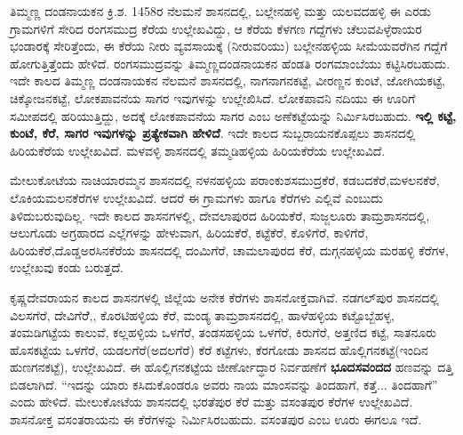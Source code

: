 ತಿಮ್ಮಣ್ಣ ದಂಡನಾಯಕನ ಕ್ರಿ.ಶ. 1458ರ ನೆಲಮನೆ ಶಾಸನದಲ್ಲಿ, ಬಲ್ಲೇನಹಳ್ಳಿ ಮತ್ತು ಯಲವದಹಳ್ಳಿ ಈ ಎರಡು ಗ್ರಾಮಗಳಿಗೆ ಸೇರಿದ ರಂಗಸಮುದ್ರ ಕೆರೆಯ ಉಲ್ಲೇಖವಿದ್ದು, ಆ ಕೆರೆಯ ಕೆಳಗಣ ಗದ್ದೆಗಳು ಚೆಲುವಪಿಳ್ಳೆರಾಯರ ಭಂಡಾರಕ್ಕೆ ಸೇರಿತ್ತೆಂದು, ಈ ಕೆರೆಯ ನೀರು ವ್ಯವಸಾಯಕ್ಕೆ (ನೀರುವರಿಯು) ಬಲ್ಲೇನಹಳ್ಳಿಯ ಸೀಮೆಯವರೆಗಿನ ಗದ್ದೆಗೆ ಹೋಗುತ್ತಿತ್ತೆಂದು ಹೇಳಿದೆ. ರಂಗಸಮುದ್ರವನ್ನು ತಿಮ್ಮಣ್ಣದಂಡನಾಯಕನ ಹೆಂಡತಿ ರಂಗಮಾಂಬೆಯು ಕಟ್ಟಿಸಿರಬಹುದು. ಇದೇ ಕಾಲದ ತಿಮ್ಮಣ್ಣ ದಂಡನಾಯಕನ ನೆಲಮನೆ ಶಾಸನದಲ್ಲಿ, ನಾಗನಾಗನಕಟ್ಟೆ, ವೀರಣ್ಣನ ಕುಂಟೆ, ಜೋಗಿಯಕಟ್ಟೆ, ಚಿಕ್ಕೋಜನಕಟ್ಟೆ, ಲೋಕಪಾವನೆಯ ಸಾಗರ ಇವುಗಳನ್ನು ಉಲ್ಲೇಖಿಸಿದೆ. ಲೋಕಪಾವನಿ ನದಿಯು ಈ ಊರಿಗೆ ಸಮೀಪದಲ್ಲಿ ಹರಿಯುತ್ತಿದ್ದು, ಅದಕ್ಕೆ ಲೋಕಪಾವನೆಯ ಸಾಗರ ಎಂಬ ಅಣೆಕಟ್ಟೆಯನ್ನು ನಿರ್ಮಿಸಿರಬಹುದು. \textbf{ಇಲ್ಲಿ ಕಟ್ಟೆ, ಕುಂಟೆ, ಕೆರೆ, ಸಾಗರ ಇವುಗಳನ್ನು ಪ್ರತ್ಯೇಕವಾಗಿ ಹೇಳಿದೆ}. ಇದೇ ಕಾಲದ ಸುಬ್ಬರಾಯನಕೊಪ್ಪಲು ಶಾಸನದಲ್ಲಿ ಹಿರಿಯಕೆರೆಯ ಉಲ್ಲೇಖವಿದೆ. ಮಳವಳ್ಳಿ ಶಾಸನದಲ್ಲಿ ತಮ್ಮಡಿಹಳ್ಳಿಯ ಹಿರಿಯಕೆರೆಯ ಉಲ್ಲೇಖವಿದೆ.

ಮೇಲುಕೋಟೆಯ ನಾಚಿಯಾರಮ್ಮನ ಶಾಸನದಲ್ಲಿ ನಳನಹಳ್ಳಿಯ ಪರಾಂಕುಶಸಮುದ್ರಕೆರೆ, ಕಡಬದಕೆರೆ,\break ಮಳಲನಕೆರೆ, ಲೊಕಿಯಮಲನಕೆರೆಗಳ ಉಲ್ಲೇಖವಿದೆ. ಆದರೆ ಈ ಗ್ರಾಮಗಳು ಹಾಗೂ ಕೆರೆಗಳು ಎಲ್ಲಿವೆ ಎಂಬುದು ತಿಳಿದುಬರುವುದಿಲ್ಲ. ಇದೇ ಕಾಲದ ಶಾಸನಗಳಲ್ಲಿ, ದೇವಲಾಪುರದ ಹಿರಿಯಕೆರೆ, ಸುಜ್ಜಲೂರು ತಾಮ್ರಶಾಸನದಲ್ಲಿ, ಆಲುಗೊಡು ಅಗ್ರಹಾರದ ಎಲ್ಲೆಗಳನ್ನು ಹೇಳುವಾಗ, ಹಿರಿಯಕೆರೆ, ಕಟ್ಟೆಕೆರೆ, ಕೊಳಿಗೆರೆ, ಕಾಳಿಗೆರೆ, ಹಿರಿಯಕೆರೆ,\break ದೊಡ್ಡಅರಸಿನಕೆರೆಯ ಶಾಸನದಲ್ಲಿ ದಂಮಿಗೆರೆ, ಚಾಮಲಾಪುರದ ಕೆರೆ, ದುಗ್ಗನಹಳ್ಳಿಯ ಮರಹಳ್ಳಿ ಕೆರೆಗಳ, ಉಲ್ಲೇಖವು ಕಂಡು ಬರುತ್ತದೆ.

ಕೃಷ್ಣದೇವರಾಯನ ಕಾಲದ ಶಾಸನಗಳಲ್ಲಿ ಜಿಲ್ಲೆಯ ಅನೇಕ ಕೆರೆಗಳು ಶಾಸನೋಕ್ತವಾಗಿವೆ. ನಡಗಲ್​ಪುರ ಶಾಸನದಲ್ಲಿ ವಿಲಸಗೆರೆ, ದೇವಿಗೆರೆೆ,, ಕೊರಟಿಹಳ್ಳಿಯ ಕೆರೆ, ಮಂಡ್ಯ ತಾಮ್ರಶಾಸನದಲ್ಲಿ, ಹಾಳೆಹಳ್ಳಿಯ ಕಟ್ಟೊಬ್ಬೆಹಳ್ಳ, ತಂಮಡಿಗಟ್ಟೆಯ ಕಾಲುವೆ, ಕಲ್ಲಹಳ್ಳಿಯ ಒಳಗೆರೆ, ತಂಡಸಹಳ್ಳಿಯ ಒಳಗೆರೆ, ಕಿರುಗೆರೆ, ಅತ್ತಣಿದ ಕಟ್ಟೆ, ಸಾತನೂರು ಹೊಸಕಟ್ಟೆಯ ಒಳಗೆರೆ, ಯಡಲಗೆರೆ(ಅದಲಗೆರೆ) ಕೆರೆ ಕಟ್ಟೆಗಳು, ಕೆರಗೋಡು ಶಾಸನದ ಹೊಲ್ಲಿಗನಕಟ್ಟೆ(ಇಂದಿನ ಹುಣಗನಕಟ್ಟೆ), ಉಲ್ಲೇಖವಿದೆ. ಈ ಹೊಲ್ಲಿಗನಕಟ್ಟೆಯ ಜೀರ್ಣೋದ್ಧಾರ ನಿರ್ವಹಣೆಗೆ \textbf{ಭೂದಸವಂದದ} ಹಣವನ್ನು ದತ್ತಿ ಬಿಡಲಾಗಿದೆ. “ಇದನ್ನು ಯಾರು ಕಸಿದುಕೊಂಡರೂ ಅವರು ನಾಯ ಮಾಂಸವನ್ನು ತಿಂದಹಾಗೆ, ಕತ್ತೆ... ತಿಂದಹಾಗೆ” ಎಂದು ಹೇಳಿದೆ. ಮೇಲುಕೋಟೆಯ ಶಾಸನದಲ್ಲಿ ಭರತೆಪುರ ಕೆರೆ ಮತ್ತು ವಸಂತಪುರ ಕೆರೆಗಳ ಉಲ್ಲೇಖವಿದೆ. ಶಾಸನೋಕ್ತ ವಸಂತರಾಯನು ಈ ಕೆರೆಗಳನ್ನು ನಿರ್ಮಿಸಿರಬಹುದು. ವಸಂತಪುರ ಎಂಬ ಊರು ಈಗಲೂ ಇದೆ.

